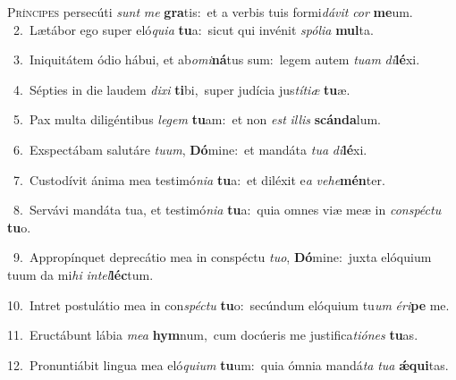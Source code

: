\lettrine{\initial\textcolor{\initialcolor}{P}}{ríncipes} persecúti \textit{sunt} \textit{me} \textbf{gra}\-tis:~\star et a verbis tuis formi\-\textit{dá}\-\textit{vit} \textit{cor} \textbf{me}\-um.\\
{\numbfont\textcolor{\numbcolor}{~2.}}~Lætábor ego super eló\-\textit{qui}\-\textit{a} \textbf{tu}\-a:~\star sicut qui invénit \textit{spó}\-\textit{li}\textit{a} \textbf{mul}\-ta.\par
{\numbfont\textcolor{\numbcolor}{~3.}}~Iniquitátem ódio hábui, et ab\-\textit{o}\-\textit{mi}\textbf{ná}tus sum:~\star legem autem \textit{tu}\-\textit{am} \textit{di}\-\textbf{lé}xi.\par
{\numbfont\textcolor{\numbcolor}{~4.}}~Sépties in die laudem \textit{di}\-\textit{xi} \textbf{ti}\-bi,~\star super judícia jus\-\textit{tí}\-\textit{ti}\textit{æ} \textbf{tu}\-æ.\par
{\numbfont\textcolor{\numbcolor}{~5.}}~Pax multa diligéntibus \textit{le}\-\textit{gem} \textbf{tu}\-am:~\star et non \textit{est} \textit{il}\-\textit{lis} \textbf{scán}\-\textbf{da}lum.\par
{\numbfont\textcolor{\numbcolor}{~6.}}~Exspectábam salutáre \textit{tu}\-\textit{um}, \textbf{Dó}\-mine:~\star et mandáta \textit{tu}\-\textit{a} \textit{di}\-\textbf{lé}xi.\par
{\numbfont\textcolor{\numbcolor}{~7.}}~Custodívit ánima mea testimó\-\textit{ni}\-\textit{a} \textbf{tu}\-a:~\star et diléxit e\textit{a} \textit{ve}\-\textit{he}\textbf{mén}ter.\par
{\numbfont\textcolor{\numbcolor}{~8.}}~Servávi mandáta tua, et testimó\-\textit{ni}\-\textit{a} \textbf{tu}\-a:~\star quia omnes viæ meæ in \textit{con}\-\textit{spéc}\textit{tu} \textbf{tu}\-o.\par
{\numbfont\textcolor{\numbcolor}{~9.}}~Appropínquet deprecátio mea in conspéctu \textit{tu}\-\textit{o}, \textbf{Dó}\-mine:~\star juxta elóquium tuum da mi\textit{hi} \textit{in}\-\textit{tel}\textbf{léc}tum.\par
{\numbfont\textcolor{\numbcolor}{10.}}~Intret postulátio mea in con\-\textit{spéc}\-\textit{tu} \textbf{tu}\-o:~\star secúndum elóquium tu\textit{um} \textit{é}\-\textit{ri}\textbf{pe} me.\par
{\numbfont\textcolor{\numbcolor}{11.}}~Eructábunt lábia \textit{me}\-\textit{a} \textbf{hym}\-num,~\star cum docúeris me justifica\-\textit{ti}\-\textit{ó}\textit{nes} \textbf{tu}\-as.\par
{\numbfont\textcolor{\numbcolor}{12.}}~Pronuntiábit lingua mea eló\-\textit{qui}\-\textit{um} \textbf{tu}\-um:~\star quia ómnia mandá\textit{ta} \textit{tu}\-\textit{a} \textbf{ǽ}\-\textbf{qui}tas.\par
